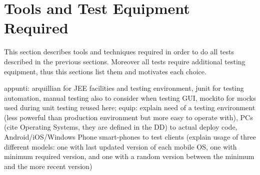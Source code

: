 \newpage
\section{Tools and Test Equipment Required}
This section describes tools and techniques required in order to do all tests described in the previous sections. Moreover all tests require additional testing equipment, thus this sections list them and motivates each choice.

appunti: arquillian for JEE facilities and testing environment, junit for testing automation, manual testing also to consider when testing GUI, mockito for mocks used during unit testing reused here; equip: explain need of a testing environment (less powerful than production environment but more easy to operate with), PCs (cite Operating Systems, they are defined in the DD) to actual deploy code, Android/iOS/Windows Phone smart-phones to test clients (explain usage of three different models: one with last updated version of each mobile OS, one with minimum required version, and one with a random version between the minimum and the more recent version)